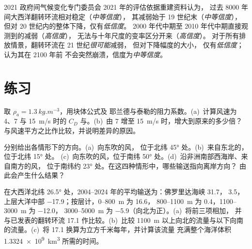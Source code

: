 \begin{dated}{2021}
政府间气候变化专门委员会 2021 年的评估依据重建资料认为，
过去 \num{8000} 年间大西洋翻转环流相对稳定（\emph{中等信度}），
其减弱始于 19 世纪末（\emph{中等信度}），
但对 20 世纪内的整体下降，仅有\emph{低信度}。
2000 年代中期至 2010 年代中期直接观测到的减弱（\emph{高信度}），
无法与十年尺度的变率区分开来（\emph{高信度}）。
对于所有排放情景，翻转环流在 21 世纪\emph{很可能}减弱，
但对下降幅度的大小，
仅有\emph{低信度}；认为其在 2100 年前
不会突然崩溃，信度为\emph{中等信度}。
\end{dated}

\section{练习}

\begin{exercise}[$\star$]\label{exo:b1:ocean-circulation:1}
取 $\rho_a = \qty{1.3}{kg.m^{-3}}$，用块体公式及
耶兰德与泰勒的阻力系数。(a)~计算风速为 4、7 与
\qty{15}{m/s} 时的 $C_D$ 与。(b)~由 7 增至 \qty{15}{m/s} 时，增大到原来的多少倍？
与风速平方之比作比较，并说明差异的原因。
\end{exercise}

\begin{exercise}[$\star$]\label{exo:b1:ocean-circulation:2}
分别给出各情形下的方向。(a)~向东吹的风，
位于北纬 \ang{45} 处。(b)~来自东北的，位于北纬 \ang{15} 处。
(c)~向东吹的风，位于南纬 \ang{50} 处。(d)~沿非洲南部西海岸、来自南方的风，
位于南纬约 \ang{23} 处。在这四种情形中，哪些输送指向离岸方向？
由此会产生什么结果？
\end{exercise}

\begin{exercise}[$\star$]\label{exo:b1:ocean-circulation:3}
在大西洋北纬 \ang{26.5} 处，2004--2024 年的平均输送为：佛罗里达海峡
\qty{31.7}{\sverdrup}， \qty{3.5}{\sverdrup}，上层大洋中部
\qty{-17.9}{\sverdrup}；按层计，0--\qty{800}{m} 为 \qty{16.6}{\sverdrup}，
800--\qty{1100}{m} 为 \qty{0.4}{\sverdrup}，1100--\qty{3000}{m} 为 \qty{-12.0}{\sverdrup}，
3000--\qty{5000}{m} 为 \qty{-5.9}{\sverdrup}（向北为正）。(a)~将前三项相加，
并与已发表的翻转环流 \qty{17.1}{\sverdrup} 作比较。(b)~比较
\qty{1100}{m} 以上向北的流量与以下向南的流量。(c)~将
\qty{17.1}{\sverdrup} 换算为立方千米每年，并计算该流量
充满整个海洋体积 \qty{1.3324e9}{km^3} 所需的时间。
\end{exercise}

